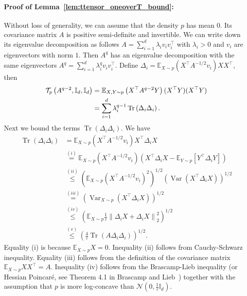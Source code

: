 \documentclass[11pt,twoside]{article}
\newcommand{\ttensor}{\mathcal{T}}
\theoremstyle{named}
\theoremstyle{plain}
\newcommand{\vecnorm}[2]{\left\| #1\right\|_{#2}}
\newcommand{\Exs}{\ensuremath{{\mathbb{E}}}}
\newcommand{\usedim}{\ensuremath{d}}
\newcommand{\dims}{\usedim}
\DeclareMathOperator{\Var}{Var}
\DeclareMathOperator{\trace}{Tr}
\newcommand{\Normal}{\ensuremath{\mathcal{N}}}
\newcommand{\Ind}{\ensuremath{\mathbb{I}}}
\newcommand{\brackets}[1]{\left[ #1 \right]}
\newcommand{\parenth}[1]{\left( #1 \right)}
\newcommand{\tp}{^\top}
\begin{document}
\paragraph{Proof of Lemma~\ref{lem:ttensor_oneoverT_bound}:}
Without loss of generality, we can assume that the density $p$ has mean $0$. Its covariance matrix $A$ is positive semi-definite and invertible. We can write down its eigenvalue decomposition as follows $A = \sum_{i=1}^\dims \lambda_i v_i v_i\tp$ with $\lambda_i > 0$ and $v_i$ are eigenvectors with norm $1$. Then $A^{q}$ has an eigenvalue decomposition with the same eigenvectors $A^q = \sum_{i=1}^\dims \lambda_i^q v_i v_i\tp$.
Define $\Delta_i = \Exs_{X \sim p} (X\tp A^{-1/2}v_i) X X \tp$, then
\begin{align}
  \label{eq:ttensor_oneoverT_first_step}
  \ttensor_p\parenth{A^{q-2}, \Ind_\dims, \Ind_\dims} &= \Exs_{X, Y \sim p} \parenth{X\tp A^{q-2} Y} (X\tp Y) (X \tp Y) \notag \\
  &= \sum_{i=1}^\dims \lambda_i^{q-1} \trace\parenth{\Delta_i \Delta_i}.
\end{align}
Next we bound the terms $\trace\parenth{\Delta_i \Delta_i}$. We have
\begin{align*}
  \trace\parenth{\Delta_i \Delta_i} &= \Exs_{X \sim p} \parenth{X \tp A^{-1/2} v_i} X\tp \Delta_i X \\
  &\stackrel{(i)}{=}  \Exs_{X \sim p} \parenth{X \tp A^{-1/2} v_i} \parenth{X\tp \Delta_i X - \Exs_{Y \sim p} \brackets{Y\tp \Delta_i Y}} \\
  &\stackrel{(ii)}{\leq} \parenth{\Exs_{X \sim p} \parenth{X \tp A^{-1/2} v_i}^2 }^{1/2} \parenth{\Var\parenth{X \tp \Delta_i X}}^{1/2} \\
  & \stackrel{(iii)}{=} \parenth{\Var_{X \sim p}\parenth{X \tp \Delta_i X}}^{1/2} \\
  &\stackrel{(iv)}{\leq} \parenth{\Exs_{X \sim p} \frac{1}{\tau} \vecnorm{\Delta_i X + \Delta_i X}{2}^2}^{1/2} \\
  &\stackrel{(v)}{\leq} \parenth{\frac{4}{\tau} \trace\parenth{A \Delta_i \Delta_i}}^{1/2}.
\end{align*}
Equality (i) is because $\Exs_{X \sim p} X = 0$. Inequality (ii) follows from Cauchy-Schwarz inequality. Equality (iii) follows from the definition of the covariance matrix $\Exs_{X\sim p} XX\tp = A$. Inequality (iv) follows from the Brascamp-Lieb inequality (or Hessian Poincar\'e, see Theorem 4.1 in Brascamp and Lieb~\cite{brascamp2002extensions}) together with the assumption that $p$ is more log-concave than $\Normal(0, \frac{1}{\tau}\Ind_\dims)$.
\end{document}
